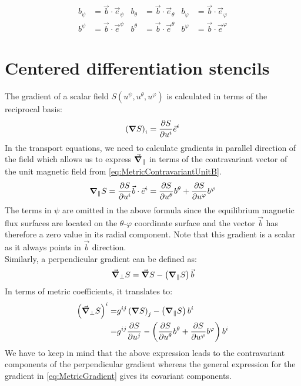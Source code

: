 \begin{align}
	b_\psi &= \vec{b} \cdot \vec{e}_\psi & b_\theta &= \vec{b} \cdot \vec{e}_\theta & b_\varphi &= \vec{b} \cdot \vec{e}_\varphi \label{eq:MetricCovariantUnitB} \\
	b^\psi &= \vec{b} \cdot \vec{e}^\psi & b^\theta &= \vec{b} \cdot \vec{e}^\theta & b^\varphi &= \vec{b} \cdot \vec{e}^\varphi \label{eq:MetricContravariantUnitB}
\end{align} 


\section{Centered differentiation stencils}
\label{sec:app_centeredOperators}

The gradient of a scalar field $S(u^\psi, u^\theta, u^\varphi)$ is calculated in terms of the reciprocal basis: 
\begin{align}
	\left(\grad{S}\right)_i = \pdv{S}{u^i}\vec{e}^i \label{eq:MetricGradient}
\end{align}
In the transport equations, we need to calculate gradients in parallel direction of the field which allows us to express $\vec{\grad}_\parallel$ in terms of the contravariant vector of the unit magnetic field from \autoref{eq:MetricContravariantUnitB}.
\begin{align}
	\grad_\parallel S = \pdv{S}{u^i}\vec{b}\cdot\vec{e}^i = \pdv{S}{u^\theta}b^\theta + \pdv{S}{u^\varphi}b^\varphi \label{eq:MetricParallelGradient}
\end{align}
The terms in $\psi$ are omitted in the above formula since the equilibrium magnetic flux surfaces are located on the $\theta$-$\varphi$ coordinate surface and the vector $\vec{b}$ has therefore a zero value in its radial component. Note that this gradient is a scalar as it always points in $\vec{b}$ direction. \\
Similarly, a perpendicular gradient can be defined as: 
\begin{equation*}
	\vec{\grad}_\perp S = \vec{\grad} S - \left(\grad_\parallel S\right)\vec{b}
\end{equation*}
In terms of metric coefficients, it translates to: 
\begin{align}
	\label{eq:MetricPerpendicularGradient}
	\left(\vec{\grad}_\perp S\right)^i =& g^{ij}\left(\grad{S}\right)_j - \left(\grad_\parallel S\right)b^i \nonumber \\
	=& g^{ij}\pdv{S}{u^j} - \left(\pdv{S}{u^\theta}b^\theta + \pdv{S}{u^\varphi}b^\varphi\right)b^i
\end{align}
We have to keep in mind that the above expression leads to the contravariant components of the perpendicular gradient whereas the general expression for the gradient in \autoref{eq:MetricGradient} gives its covariant components. \\

